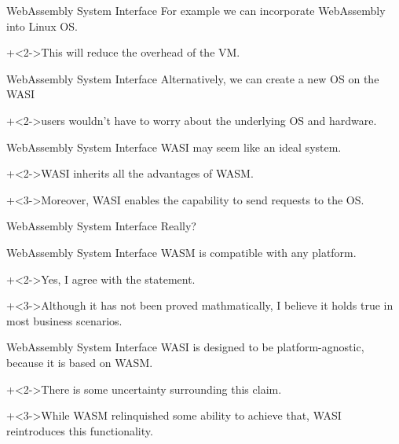 \begin{frame}{WebAssembly System Interface}{}
    For example we can incorporate WebAssembly into Linux OS.
    \vspace{4ex}

    \onslide+<2->{This will reduce the overhead of the VM.}
\end{frame}


\begin{frame}{WebAssembly System Interface}{}
    Alternatively, we can create a new OS on the WASI
    \vspace{4ex}

    \onslide+<2->{users wouldn't have to worry about the underlying OS and hardware.}
\end{frame}


\begin{frame}{WebAssembly System Interface}{}
    WASI may seem like an ideal system.
    \vspace{4ex}

    \onslide+<2->{WASI inherits all the advantages of WASM.}
    \vspace{2ex}

    \onslide+<3->{Moreover, WASI enables the capability to send requests to the OS.}
\end{frame}


\begin{frame}{WebAssembly System Interface}{}
    {\Huge Really?}
\end{frame}


\begin{frame}{WebAssembly System Interface}{}
    WASM is compatible with any platform.
    \vspace{4ex}

    \onslide+<2->{Yes, I agree with the statement.}
    \vspace{4ex}

    \onslide+<3->{Although it has not been proved mathmatically, I believe it holds true in most business scenarios.}
\end{frame}


\begin{frame}{WebAssembly System Interface}{}
    WASI is designed to be platform-agnostic, because it is based on WASM.
    \vspace{4ex}

    \onslide+<2->{There is some uncertainty surrounding this claim.}
    \vspace{4ex}

    \onslide+<3->{While WASM relinquished some ability to achieve that, WASI reintroduces this functionality.}
\end{frame}


